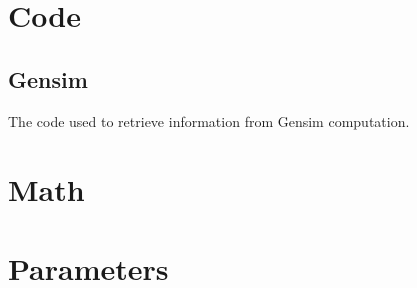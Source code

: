


\chapter{Code}
\section{Gensim}
The code used to retrieve information from Gensim computation. 

 \chapter{Math}

\chapter{Parameters}

